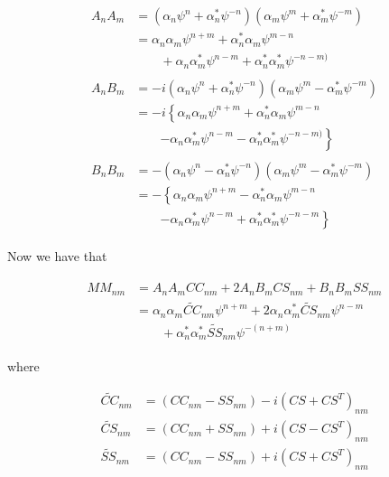 \documentclass[apj]{emulateapj}
\newcommand{\CCt}{\widetilde{CC}}
\newcommand{\CSt}{\widetilde{CS}}
\newcommand{\SSt}{\widetilde{SS}}
\newcommand{\eith}{\psi}
\begin{document}
\begin{align}
\begin{split}
A_nA_m &= \left(\alpha_n\eith^n + \alpha^{*}_n\eith^{-n}\right)\left(\alpha_m\eith^m + \alpha^{*}_m\eith^{-m}\right)\\
       &= \alpha_n\alpha_m \eith^{n+m} + \alpha^{*}_n\alpha_m\eith^{m-n} \\
       &\qquad + \alpha_n\alpha^{*}_m \eith^{n-m} + \alpha^{*}_n\alpha^{*}_m\eith^{-n-m)}
\end{split}\\
\begin{split}
A_nB_m &= -i\left(\alpha_n\eith^n + \alpha^{*}_n\eith^{-n}\right)\left(\alpha_m\eith^m - \alpha^{*}_m\eith^{-m}\right)\\
       &= -i\left\{\alpha_n\alpha_m \eith^{n+m} + \alpha^{*}_n\alpha_m\eith^{m-n} \right.\\
       &\qquad \left. - \alpha_n\alpha^{*}_m \eith^{n-m} - \alpha^{*}_n\alpha^{*}_m\eith^{-n-m)}\right\}
\end{split}\\
\begin{split}
B_nB_m &= -\left(\alpha_n\eith^n - \alpha^{*}_n\eith^{-n}\right)\left(\alpha_m\eith^m - \alpha^{*}_m\eith^{-m}\right)\\
       &= -\left\{\alpha_n\alpha_m \eith^{n+m} - \alpha^{*}_n\alpha_m\eith^{m-n} \right.\\
       &\qquad \left.- \alpha_n\alpha^{*}_m \eith^{n-m} + \alpha^{*}_n\alpha^{*}_m\eith^{-n-m}\right\}
\end{split}
\end{align}


Now we have that

\begin{align}
\begin{split}
MM_{nm} &= A_nA_mCC_{nm} + 2A_nB_mCS_{nm} + B_nB_mSS_{nm}\\
        &= \alpha_n\alpha_m\CCt_{nm}\eith^{n+m} + 2\alpha_n\alpha^{*}_m\CSt_{nm}\eith^{n-m} \\
        &\qquad + \alpha^{*}_n\alpha^{*}_m\SSt_{nm}\eith^{-(n+m)}
\end{split}
\end{align}

where

\begin{align}
\CCt_{nm}  &= (CC_{nm} - SS_{nm}) - i\left(CS + CS^T\right)_{nm} \\
\CSt_{nm}  &= (CC_{nm} + SS_{nm}) + i\left(CS - CS^T\right)_{nm}\\
\SSt_{nm}  &= (CC_{nm} - SS_{nm}) + i\left(CS + CS^T\right)_{nm} 
\end{align}
\end{document}
